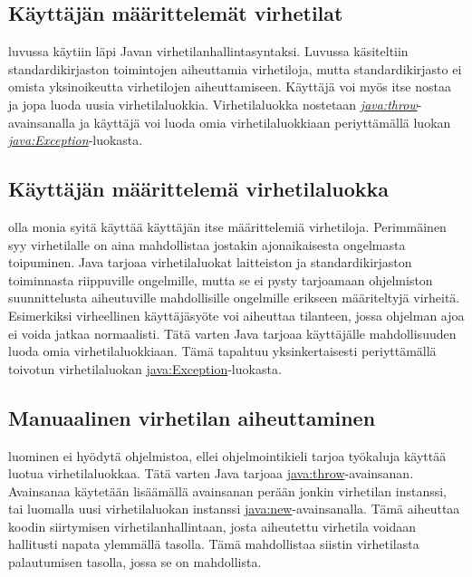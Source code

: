 \documentclass[a4paper,justified,notoc]{tufte-book}
\newcommand{\java}[1]{\underline{\gls{java:#1}}}
\newcommand{\newjava}[1]{\textit{\java{#1}}}
\begin{document}
\begin{fullwidth}

\section{Käyttäjän määrittelemät virhetilat}
\label{exception}

 luvussa  käytiin läpi Javan
virhetilanhallintasyntaksi. Luvussa käsiteltiin standardikirjaston toimintojen aiheuttamia
virhetiloja, mutta standardikirjasto ei omista yksinoikeutta virhetilojen aiheuttamiseen. Käyttäjä
voi myös itse nostaa ja jopa luoda uusia virhetilaluokkia. Virhetilaluokka nostetaan
\newjava{throw}-avainsanalla ja käyttäjä voi luoda omia virhetilaluokkiaan periyttämällä luokan
\newjava{Exception}-luokasta.

\subsection{Käyttäjän määrittelemä virhetilaluokka}
\label{exception}

 olla monia syitä käyttää käyttäjän itse määrittelemiä virhetiloja.
Perimmäinen syy virhetilalle on aina mahdollistaa jostakin ajonaikaisesta ongelmasta toipuminen.
Java tarjoaa virhetilaluokat laitteiston ja standardikirjaston toiminnasta riippuville ongelmille,
mutta se ei pysty tarjoamaan ohjelmiston suunnittelusta aiheutuville mahdollisille ongelmille
erikseen määriteltyjä virheitä. Esimerkiksi virheellinen käyttäjäsyöte voi aiheuttaa tilanteen,
jossa ohjelman ajoa ei voida jatkaa normaalisti. Tätä varten Java tarjoaa käyttäjälle
mahdollisuuden luoda omia virhetilaluokkiaan. Tämä tapahtuu yksinkertaisesti periyttämällä
toivotun virhetilaluokan \java{Exception}-luokasta.

\subsection{Manuaalinen virhetilan aiheuttaminen}
\label{throws}

 luominen ei hyödytä ohjelmistoa, ellei ohjelmointikieli tarjoa
työkaluja käyttää luotua virhetilaluokkaa. Tätä varten Java tarjoaa \java{throw}-avainsanan.
Avainsanaa käytetään lisäämällä avainsanan perään jonkin virhetilan instanssi, tai luomalla uusi
virhetilaluokan instanssi \java{new}-avainsanalla. Tämä aiheuttaa koodin siirtymisen
virhetilanhallintaan, josta aiheutettu virhetila voidaan hallitusti napata ylemmällä tasolla. Tämä
mahdollistaa siistin virhetilasta palautumisen tasolla, jossa se on mahdollista. 


\end{fullwidth}
\end{document}
